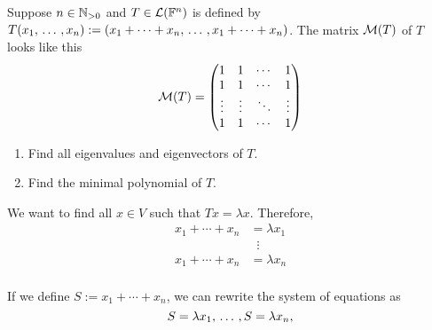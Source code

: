 \begin{xrcs}
  Suppose $n \in \mathbb{N}_{>0}$ and $T \in \mathcal{L}(\mathbb{F}^n)$ is defined by $T(x_1 , {\, \ldots \,\,}, x_n) := (x_1 + \cdots + x_n, {\, \ldots \,\,}, x_1 + \cdots + x_n)$. The matrix $\mathcal{M} (T)$ of $T$ looks like this
  \begin{equation}
    \mathcal{M} (T) =
    \begin{pmatrix}
      1 & 1 & \cdots & 1 \\
      1 & 1 & \cdots & 1 \\
      \vdots & \vdots & \ddots & \vdots \\
      1 & 1 & \cdots & 1
    \end{pmatrix}
  \end{equation}

  \begin{enumerate}
    \item Find all eigenvalues and eigenvectors of $T$.
    \item Find the minimal polynomial of $T$.
  \end{enumerate}

  \begin{xsol}
    We want to find all $x \in V$ such that $Tx = \lambda x$. Therefore,
    \begin{equation}
      \begin{aligned}
        x_1 + \cdots + x_n &= \lambda x_1 \\
        & \; \; \vdots \\
        x_1 + \cdots + x_n &= \lambda x_n \\
      \end{aligned}
    \end{equation}

    If we define $S := x_1 + \cdots + x_n$, we can rewrite the system of equations as
    \begin{equation}
      \label{eq: equations for S}
      S= \lambda x_1, {\, \ldots \,\,}, S= \lambda x_n,
    \end{equation}


\end{xsol}
\end{xrcs}
